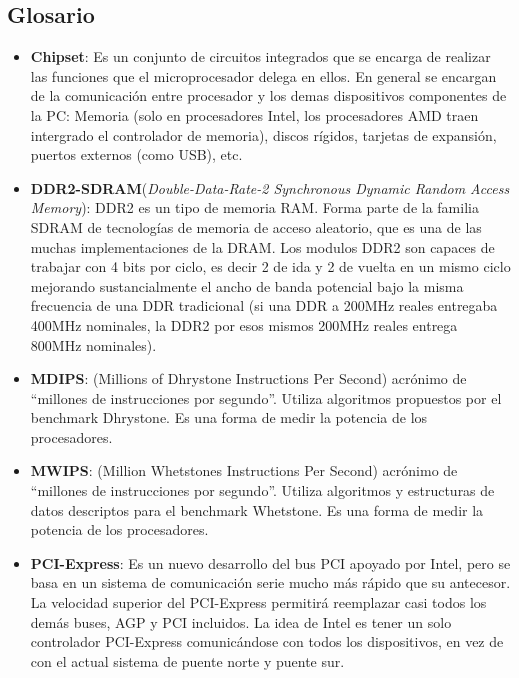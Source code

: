 \subsection{Glosario}

\begin{itemize}

\item \textbf{Chipset}: Es un conjunto de circuitos integrados que se encarga 
de realizar las funciones que el microprocesador delega en ellos. En general
 se encargan de la comunicación entre procesador y los demas dispositivos 
componentes de la PC: Memoria (solo en procesadores Intel, los procesadores 
AMD traen intergrado el controlador de memoria), discos rígidos, tarjetas de 
expansión, puertos externos (como USB), etc.

\item \textbf{DDR2-SDRAM}(\textit{Double-Data-Rate-2 Synchronous Dynamic Random Access
Memory}): DDR2 es un tipo de memoria RAM. Forma parte de la familia SDRAM de
tecnologías de memoria de acceso aleatorio, que es una de las muchas
implementaciones de la DRAM. Los modulos DDR2 son capaces de trabajar con 4 bits
por ciclo, es decir 2 de ida y 2 de vuelta en un mismo ciclo mejorando
sustancialmente el ancho de banda potencial bajo la misma frecuencia de una DDR
tradicional (si una DDR a 200MHz reales entregaba 400MHz nominales, la DDR2 por
esos mismos 200MHz reales entrega 800MHz nominales).

\item \textbf{MDIPS}: (Millions of Dhrystone Instructions Per Second) acrónimo de
 ``millones de instrucciones por segundo''. Utiliza algoritmos propuestos
por el benchmark Dhrystone. Es una forma de medir la potencia de los
 procesadores. 

\item \textbf{MWIPS}: (Million Whetstones Instructions Per Second) acrónimo de
 ``millones de instrucciones por segundo''. Utiliza algoritmos y estructuras de datos
descriptos para el benchmark Whetstone. Es una forma de medir la potencia de los
 procesadores. 


\item \textbf{PCI-Express}: Es un nuevo desarrollo del bus PCI apoyado por
Intel, pero se basa en un sistema de comunicación serie mucho más rápido que su
antecesor. La velocidad superior del PCI-Express permitirá reemplazar casi todos
los demás buses, AGP y PCI incluidos. La idea de Intel es tener un solo
controlador PCI-Express comunicándose con todos los dispositivos, en vez de con
el actual sistema de puente norte y puente sur.


\end{itemize}
